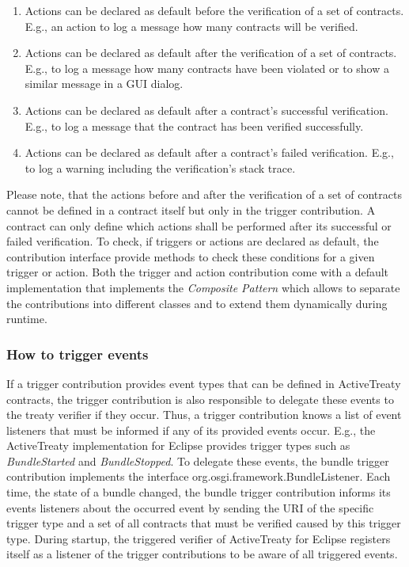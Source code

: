 \documentclass{llncs}
\begin{document}
\begin{enumerate}
	\item Actions can be declared as default before the verification of a set of contracts. E.g., an action to log a message how many contracts will be verified.
	\item Actions can be declared as default after the verification of a set of contracts. E.g., to log a message how many contracts have been violated or to show a similar message in a GUI dialog.
	\item Actions can be declared as default after a contract's successful verification. E.g., to log a message that the contract has been verified successfully.
	\item Actions can be declared as default after a contract's failed verification. E.g., to log a warning including the verification's stack trace.
\end{enumerate}

Please note, that the actions before and after the verification of a set of contracts cannot be defined in a contract itself but only in the trigger contribution. A contract can only define which actions shall be performed after its successful or failed verification. To check, if triggers or actions are declared as default, the contribution interface provide methods to check these conditions for a given trigger or action. Both the trigger and action contribution come with a default implementation that implements the \textit{Composite Pattern} \cite{TODO GOF Book} which allows to separate the contributions into different classes and to extend them dynamically during runtime.

\subsubsection{How to trigger events}

If a trigger contribution provides event types that can be defined in ActiveTreaty contracts, the trigger contribution is also responsible to delegate these events to the treaty verifier if they occur. Thus, a trigger contribution knows a list of event listeners that must be informed if any of its provided events occur. E.g., the ActiveTreaty implementation for Eclipse provides trigger types such as \textit{BundleStarted} and \textit{BundleStopped}. To delegate these events, the bundle trigger contribution implements the interface org.osgi.framework.BundleListener. Each time, the state of a bundle changed, the bundle trigger contribution informs its events listeners about the occurred event by sending the URI of the specific trigger type and a set of all contracts that must be verified caused by this trigger type. During startup, the triggered verifier of ActiveTreaty for Eclipse registers itself as a listener of the trigger contributions to be aware of all triggered events.
\end{document}
